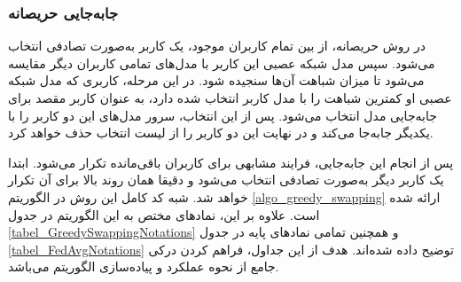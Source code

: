 \subsubsection{جابه‌جایی حریصانه}

در روش حریصانه، از بین تمام کاربران موجود، یک کاربر به‌صورت تصادفی انتخاب می‌شود. سپس مدل شبکه عصبی این کاربر با مدل‌های تمامی کاربران دیگر مقایسه می‌شود تا میزان شباهت آن‌ها سنجیده شود. در این مرحله، کاربری که مدل شبکه عصبی او کمترین شباهت را با مدل کاربر انتخاب‌ شده دارد، به عنوان کاربر مقصد برای جابه‌جایی مدل انتخاب می‌شود. پس از این انتخاب، سرور مدل‌های این دو کاربر را با یکدیگر جابه‌جا می‌کند و در نهایت این دو کاربر را از لیست انتخاب حذف خواهد کرد.

پس از انجام این جابه‌جایی، فرایند مشابهی برای کاربران باقی‌مانده تکرار می‌شود. ابتدا یک کاربر دیگر به‌صورت تصادفی انتخاب می‌شود و دقیقا همان روند بالا برای آن تکرار خواهد شد.
شبه کد کامل این روش در الگوریتم
\ref{algo_greedy_swapping}
ارائه شده است. علاوه بر این، نمادهای مختص به این الگوریتم در جدول
\ref{tabel_GreedySwappingNotations}
و همچنین تمامی نمادهای پایه در جدول
\ref{tabel_FedAvgNotations}
توضیح داده شده‌اند.
هدف از این جداول، فراهم کردن درکی جامع از نحوه عملکرد و پیاده‌سازی الگوریتم می‌باشد.


\begin{LTR}
	\begin{algorithm}[t]
		\begin{RTL}
			\caption{%
				جابه‌جایی حریصانه
			}
			\label{algo_greedy_swapping}
		\end{RTL}
		
		\begin{latin}
		\end{latin}
	\end{algorithm}
\end{LTR}

